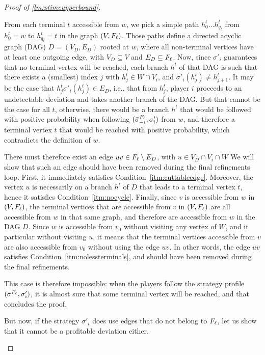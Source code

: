 \begin{proof}[Proof of \cref{lm:ptimeupperbound}]
\begin{claimproof}
\begin{claimproof}
    From each terminal $t$ accessible from $w$, we pick a simple path $h_0^t \dots h_{q_t}^t$ from $h_0^t = w$ to $h_{q_t}^t = t$ in the graph $(V, F_\ell)$.
    Those paths define a directed acyclic graph (DAG) $D = (V_D, E_D)$ rooted at $w$, where all non-terminal vertices have at least one outgoing edge, with $V_D \subseteq V$ and $E_D \subseteq F_\ell$.
    Now, since $\sigma'_i$ guarantees that no terminal vertex will be reached, each branch $h^t$ of that DAG is such that there exists a (smallest) index $j$ with $h^t_j \in W \cap V_i$, and $\sigma'_i(h^t_j) \neq h^t_{j+1}$.
    It may be the case that $h^t_j \sigma'_i(h^t_j) \in E_D$, i.e., that from $h^t_j$, player $i$ proceeds to an undetectable deviation and takes another branch of the DAG.
    But that cannot be the case for all $t$, otherwise, there would be a branch $h^t$ that would be followed with positive probability when following $({\bar{\sigma}}^{F_\ell}_{-i}, \sigma'_i)$ from $w$, and therefore a terminal vertex $t$ that would be reached with positive probability, which contradicts the definition of $w$.

    There must therefore exist an edge $uv \in F_\ell \setminus E_D$, with $u \in V_D \cap V_i \cap W$
    We will show that such an edge should have been removed during the final refinements loop.
    First, it immediately satisfies Condition~\ref{itm:cuttableedge}.
    Moreover, the vertex $u$ is necessarily on a branch $h^t$ of $D$ that leads to a terminal vertex $t$, hence it satisfies Condition~\ref{itm:nocycle}.
    Finally, since $v$ is accessible from $w$ in $(V, F_\ell)$, the terminal vertices that are accessible from $v$ in $(V, F_\ell)$ are all accessible from $w$ in that same graph, and therefore are accessible from $w$ in the DAG $D$.
    Since $w$ is accessible from $v_0$ without visiting any vertex of $W$, and it particular without visiting $u$, it means that the terminal vertices accessible from $v$ are also accessible from $v_0$ without using the edge $uv$.
    In other words, the edge $uv$ satisfies Condition~\ref{itm:nolessterminals}, and should have been removed during the final refinements.

    This case is therefore impossible: when the players follow the strategy profile $({\bar{\sigma}}^{F_\ell}, \sigma'_i)$, it is almost sure that some terminal vertex will be reached, and that concludes the proof.
\end{claimproof}
        
But now, if the strategy $\sigma'_i$ does use edges that do not belong to $F_\ell$, let us show that it cannot be a profitable deviation either.


\end{claimproof}
\end{proof}
